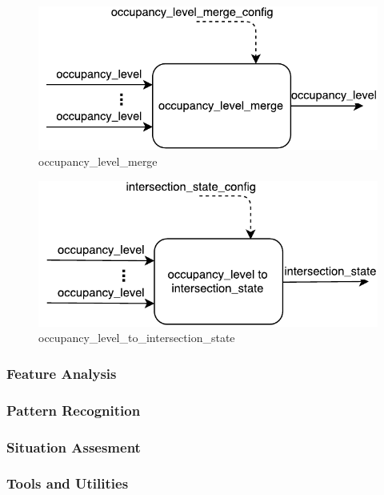 \begin{description}
\begin{figure}[ht!]
\centering
\includegraphics[scale=0.7]{fig/3/occupancy_level_merge.pdf}
\caption{occupancy\_level\_merge}
\label{occupancy_level_merge}
\end{figure}

\begin{figure}[ht!]
\centering
\includegraphics[scale=0.7]{fig/3/occupancy_level2int_state.pdf}
\caption{occupancy\_level\_to\_intersection\_state}
\label{occupancy_level2int_state}
\end{figure}

\end{description}



\subsubsection{Feature Analysis}
\subsubsection{Pattern Recognition}
\subsubsection{Situation Assesment}
\subsubsection{Tools and Utilities}
